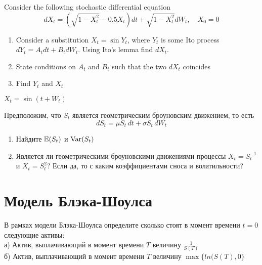 \begin{problem}
Consider the following stochastic differential equation
\begin{equation}
dX_t=(\sqrt{1-X_t^2}-0.5X_t)dt+\sqrt{1-X_t^2}dW_t, \quad X_0=0
\end{equation}
\begin{enumerate}
\item Consider a substitution $X_t=\sin Y_t$, where $Y_t$ is some Ito process $dY_t=A_tdt+B_tdW_t$. Using Ito's lemma find $dX_t$.
\item State conditions on $A_t$ and $B_t$ such that the two $dX_t$ coincides
\item Find $Y_t$ and $X_t$
\end{enumerate}
\end{problem} 
\begin{solution} 
$X_t=\sin(t+W_t)$
\end{solution}


\begin{problem}
Предположим, что $S_t$ является геометрическим броуновским движением, то есть 
\[
dS_t = \mu S_t \, dt + \sigma S_t \, dW_t
\]


\begin{enumerate}
\item Найдите $\mathbb{E}(S_t)$ и $\operatorname{Var}(S_t)$
\item Является ли геометрическими броуновскими движениями процессы $X_t=S_t^{-1}$ и $X_t=S_t^{2}$? Если да, то с каким коэффициентами сноса и волатильности?
\end{enumerate}

\end{problem} 
\begin{solution} 

\end{solution}


\section{Модель Блэка-Шоулса} 


\begin{problem}
В рамках модели Блэка-Шоулса определите сколько стоят в момент времени $t=0$ следующие активы: \\
а) Актив, выплачивающий в момент времени $T$ величину $\frac{1}{S(T)}$ \\
б) Актив, выплачивающий в момент времени $T$ величину $\max\{ln(S(T),0\}$ 
\end{problem} 
\begin{solution} 

\end{solution}

